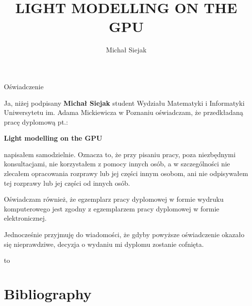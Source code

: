 \documentclass[twoside,openright,a4paper,12pt]{memoir}
\begin{document}
\title{LIGHT MODELLING ON THE GPU}
\author{Michał Siejak}

\frontmatter
{}
\maketitle
\newpage
{}
\setcounter{page}{2}

\begin{center}
  \LARGE{Oświadczenie}
\end{center}

Ja, niżej podpisany \textbf{Michał Siejak} student Wydziału
Matematyki i Informatyki Uniwersytetu im. Adama Mickiewicza w Poznaniu
oświadczam, że przedkładaną pracę dyplomową pt.:

\centerline{\textbf{Light modelling on the GPU}}

napisałem samodzielnie. Oznacza to, że przy pisaniu pracy, poza niezbędnymi
konsultacjami, nie korzystałem z pomocy innych osób, a w szczególności nie
zlecałem opracowania rozprawy lub jej części innym osobom, ani nie
odpisywałem tej rozprawy lub jej części od innych osób.

Oświadczam również, że egzemplarz pracy dyplomowej w formie wydruku
komputerowego jest zgodny z egzemplarzem pracy dyplomowej w formie
elektronicznej.

Jednocześnie przyjmuję do wiadomości, że gdyby powyższe oświadczenie
okazało się nieprawdziwe, decyzja o wydaniu mi dyplomu zostanie cofnięta.

\newcommand{\kropki}[2]{%
  \vbox{%
    \hbox to #1{\dotfill}%
    \vspace{4pt}%
    \hbox to #1{\hss #2\hss}%
  }
}
\vspace{1cm}
\hbox to \textwidth{%
  \hfil
  \kropki{4cm}{data}%
  \hfil\hfil
  \kropki{4cm}{podpis}%
  \hfil
}
\newpage

\begin{abstract}
\end{abstract}
\newpage

\tableofcontents*

\mainmatter








\backmatter
\section*{Bibliography}
\printbibliography
\end{document}
